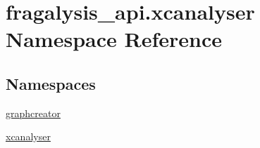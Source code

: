 \hypertarget{namespacefragalysis__api_1_1xcanalyser}{}\section{fragalysis\+\_\+api.\+xcanalyser Namespace Reference}
\label{namespacefragalysis__api_1_1xcanalyser}
\subsection*{Namespaces}
\begin{DoxyCompactItemize}
\item 
 \hyperlink{namespacefragalysis__api_1_1xcanalyser_1_1graphcreator}{graphcreator}
\item 
 \hyperlink{namespacefragalysis__api_1_1xcanalyser_1_1xcanalyser}{xcanalyser}
\end{DoxyCompactItemize}
